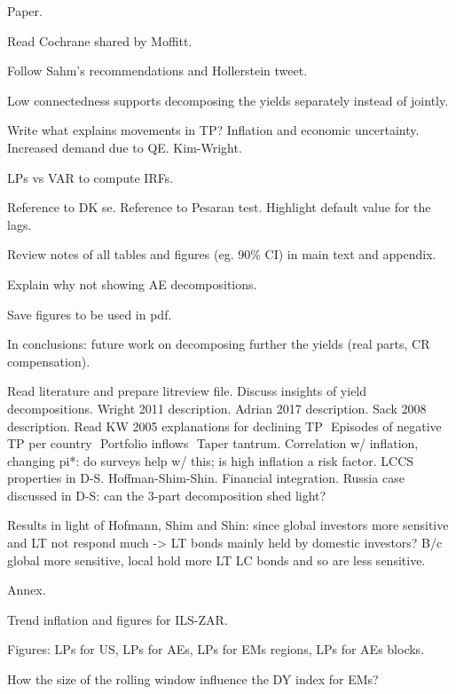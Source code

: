 \documentclass[12pt]{article}
\newcommand{\cmark}{\ding{51}}
\newcommand{\done}{\rlap{$\square$}{\raisebox{2pt}{\large\hspace{1pt}\cmark}}%
	\hspace{-2.5pt}}
\begin{document}
\begin{todolist}	
	\item Paper.
	\begin{todolist}
		\item Read Cochrane shared by Moffitt.
		\item Follow Sahm's recommendations and Hollerstein tweet.
		\item Low connectedness supports decomposing the yields separately instead of jointly.
		\item Write what explains movements in TP? Inflation and economic uncertainty. Increased demand due to QE. Kim-Wright.
		\item LPs vs VAR to compute IRFs.
		\item Reference to DK se. Reference to Pesaran test. Highlight default value for the lags.
		\item Review notes of all tables and figures (eg. 90\% CI) in main text and appendix.
		\item Explain why not showing AE decompositions.
		\item Save figures to be used in pdf.
		\item In conclusions: future work on decomposing further the yields (real parts, CR compensation).
		\item Read literature and prepare litreview file. Discuss insights of yield decompositions. Wright 2011 description. Adrian 2017 description. Sack 2008 description. Read KW 2005 explanations for declining TP \(<->\) Episodes of negative TP per country \(<->\) Portfolio inflows \(<->\) Taper tantrum. Correlation w/ inflation, changing pi*: do surveys help w/ this; is high inflation a risk factor. LCCS properties in D-S. Hoffman-Shim-Shin. Financial integration. Russia case discussed in D-S: can the 3-part decomposition shed light?
		\item Results in light of Hofmann, Shim and Shin: since global investors more sensitive and LT not respond much -> LT bonds mainly held by domestic investors? B/c global more sensitive, local hold more LT LC bonds and so are less sensitive.
	\end{todolist}
	
	\item Annex.
	\begin{todolist}
		\item[\done] Trend inflation and figures for ILS-ZAR.
		\item Figures: LPs for US, LPs for AEs, LPs for EMs regions, LPs for AEs blocks.
		\item How the size of the rolling window influence the DY index for EMs?
	\end{todolist}
	
\end{todolist}
\end{document}
